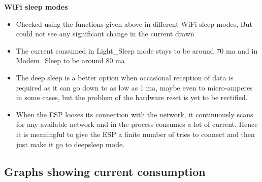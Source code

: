 \documentclass[16pt]{article}
\begin{document}
\textbf{WiFi sleep modes}

\begin{itemize}

\item
  Checked using the functions given above in different WiFi sleep modes,
  But could not see any significant change in the current drawn
\item
  The current consumed in Light\_Sleep mode stays to be around 70 ma and
  in Modem\_Sleep to be aroun\vspace{0.5cm}d 80 ma
\item
  The deep sleep is a better option when occasional reception of data is
  required as it can go down to as low as 1 ma, maybe even to
  micro-amperes in some cases, but the problem of the hardware reset is
  yet to be rectified.
\item
  When the ESP looses its connection with the network, it continuously
  scans for any available network and in the process consumes a lot of
  current. Hence it is meaningful to give the ESP a finite number of
  tries to connect and then just make it go to deepsleep mode.
\end{itemize}


\vspace{0.5cm}
\subsection{Graphs showing current
consumption}
\end{document}
